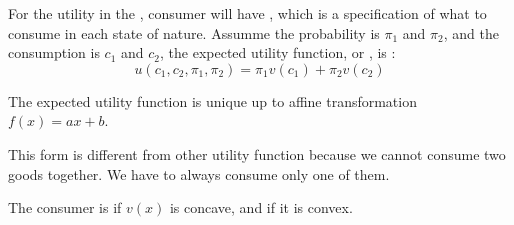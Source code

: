 \begin{definition}
    For the utility in the , consumer will have , which is a specification of what to consume in each state of nature. Assumme the probability is $\pi_1$ and $\pi_2$, and the consumption is $c_1$ and $c_2$, the expected utility function, or , is :
    \begin{equation}
        u(c_1, c_2, \pi_1, \pi_2) = \pi_1 v(c_1) + \pi_2 v(c_2)
    \end{equation}
    
    The expected utility function is unique up to affine transformation $f(x) = ax + b$. 
    
    This form is different from other utility function because we cannot consume two goods together. We have to always consume only one of them.
    
    The consumer is  if $v(x)$ is concave, and  if it is convex. 
\end{definition}

